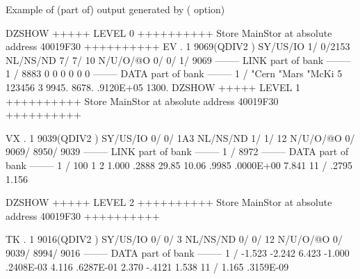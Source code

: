 \medskip
\begin{Listing}{Example of (part of) output generated by  ( option)}

DZSHOW  +++++ LEVEL     0 ++++++++++            Store  MainStor at absolute address 40019F30      ++++++++++                     
 EV  .     1     9069(QDIV2   ) SY/US/IO    1/    0/2153 NL/NS/ND    7/    7/      10 N/U/O/@O       0/       0/       1/    9069
--------  LINK part of bank  --------                                                                                            
      1 /        8883           0           0           0           0           0           0                                    
--------  DATA part of bank  --------                                                                                            
      1 /       "Cern       "Mars       "McKi           5      123456           3   9945.       8678.       .9120E+05   1300.    
DZSHOW  +++++ LEVEL     1 ++++++++++            Store  MainStor at absolute address 40019F30      ++++++++++                     
                                                                                                                                 
 VX  .     1     9039(QDIV2   ) SY/US/IO    0/    0/ 1A3 NL/NS/ND    1/    1/      12 N/U/O/@O       0/    9069/    8950/    9039
--------  LINK part of bank  --------                                                                                            
      1 /        8972                                                                                                            
--------  DATA part of bank  --------                                                                                            
      1 /         100           1           2   1.000       .2888       29.85       10.06       .9985       .0000E+00   7.841    
     11 /   .2795       1.156                                                                                                    
                                                                                                                                 
DZSHOW  +++++ LEVEL     2 ++++++++++            Store  MainStor at absolute address 40019F30      ++++++++++                     
                                                                                                                                 
 TK  .     1     9016(QDIV2   ) SY/US/IO    0/    0/   3 NL/NS/ND    0/    0/      12 N/U/O/@O       0/    9039/    8994/    9016
--------  DATA part of bank  --------                                                                                            
      1 /  -1.523      -2.242       6.423      -1.000       .2408E-03   4.116       .6287E-01   2.370      -.4121       1.538    
     11 /   1.165       .3159E-09                                                                                                
\end{Listing}

